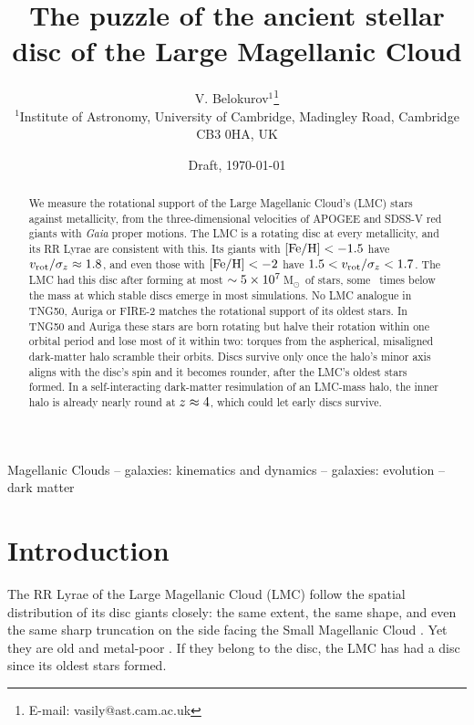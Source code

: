 \documentclass[fleqn,usenatbib,letters]{mnras}
\title[The puzzle of the LMC's ancient disc]{The puzzle of the ancient stellar disc of the Large Magellanic Cloud}
\author[V. Belokurov]{V. Belokurov$^{1}$\thanks{E-mail: vasily@ast.cam.ac.uk}\\
$^{1}$Institute of Astronomy, University of Cambridge, Madingley Road, Cambridge CB3 0HA, UK}
\date{Draft, \today}
\newcommand{\feh}{[{\rm Fe/H}]}
\newcommand{\Msun}{\,M$_\odot$}
\begin{document}
\label{firstpage}
\pagerange{\pageref{firstpage}--\pageref{lastpage}}
\maketitle

\begin{abstract}
We measure the rotational support of the Large Magellanic Cloud's
(LMC) stars against metallicity, from the three-dimensional velocities
of APOGEE and SDSS-V red giants with \textit{Gaia} proper motions. The LMC is a rotating disc at every
metallicity, and its RR Lyrae are consistent with this. Its giants with
$\feh<\ltFehA$ have $v_{\rm rot}/\sigma_z\approx1.8$, and even
those with $\feh<\ltLowFeh$ have $1.5<v_{\rm rot}/\sigma_z<1.7$.
The LMC had this disc after forming at most $\sim5\times10^{7}$\Msun\ of stars, some
\ltEarlyRatio\ times below the mass at which stable
discs emerge in most simulations. No LMC analogue in TNG50,
Auriga or FIRE-2 matches the rotational support of its oldest stars. In TNG50
and Auriga these stars are born rotating but halve their rotation
within one orbital period and lose most of it within two: torques from
the aspherical, misaligned dark-matter halo scramble their orbits. Discs survive only once
the halo's minor axis aligns with the disc's spin and it becomes
rounder, after the LMC's oldest stars formed. In a self-interacting
dark-matter resimulation of an LMC-mass halo, the inner halo is
already nearly round at $z\approx4$, which could let early discs
survive.
\end{abstract}

\begin{keywords}
Magellanic Clouds -- galaxies: kinematics and dynamics -- galaxies: evolution -- dark matter
\end{keywords}

\section{Introduction}

The RR Lyrae of the Large Magellanic Cloud (LMC) follow the spatial
distribution of its disc giants closely: the same extent, the same
shape, and even the same sharp truncation on the side facing the Small
Magellanic Cloud \citep[SMC;][fig.~1]{Grady2021}. Yet they are old and
metal-poor \citep{Alcock1996,Olsen1998,Gratton2004,Borissova2006,Skowron2016}.
If they belong to the disc, the LMC has had a disc since its oldest
stars formed.
\end{document}
